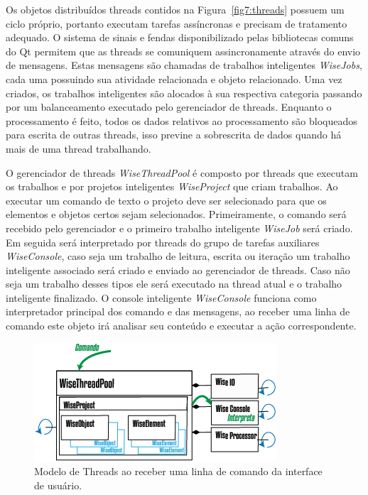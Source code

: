 \documentclass[
        english,			
        brazil			        %
        ,<...>]{abntbibufjf}
\begin{document}
Os objetos distribuídos threads contidos na Figura~\ref{fig7:threads} possuem um ciclo próprio, portanto executam tarefas assíncronas e precisam de tratamento adequado. O sistema de sinais e fendas disponibilizado pelas bibliotecas comuns do Qt permitem que as threads se comuniquem assincronamente através do envio de mensagens. Estas mensagens são chamadas de trabalhos inteligentes \textit{WiseJobs}, cada uma possuindo sua atividade relacionada e objeto relacionado. Uma vez criados, os trabalhos inteligentes são alocados à sua respectiva categoria passando por um balanceamento executado pelo gerenciador de threads. Enquanto o processamento é feito, todos os dados relativos ao processamento são bloqueados para escrita de outras threads, isso previne a sobrescrita de dados quando há mais de uma thread trabalhando.

O gerenciador de threads \textit{WiseThreadPool} é composto por threads que executam os trabalhos e por projetos inteligentes \textit{WiseProject} que criam trabalhos. Ao executar um comando de texto o projeto deve ser selecionado para que os elementos e objetos certos sejam selecionados. Primeiramente, o comando será recebido pelo gerenciador e o primeiro trabalho inteligente \textit{WiseJob} será criado. Em seguida será interpretado por threads do grupo de tarefas auxiliares \textit{WiseConsole}, caso seja um trabalho de leitura, escrita ou iteração um trabalho inteligente associado será criado e enviado ao gerenciador de threads. Caso não seja um trabalho desses tipos ele será executado na thread atual e o trabalho inteligente finalizado. O console inteligente \textit{WiseConsole} funciona como interpretador principal dos comando e das mensagens, ao receber uma linha de comando este objeto irá analisar seu conteúdo e executar a ação correspondente.

\begin{figure}[!htbp]
	\centering
	\includegraphics[scale=1]{Figures/WiseThreaPoolCMD.png}
	\caption{Modelo de Threads ao receber uma linha de comando da interface de usuário.}
	\label{fig8:threads}
\end{figure}
\end{document}
